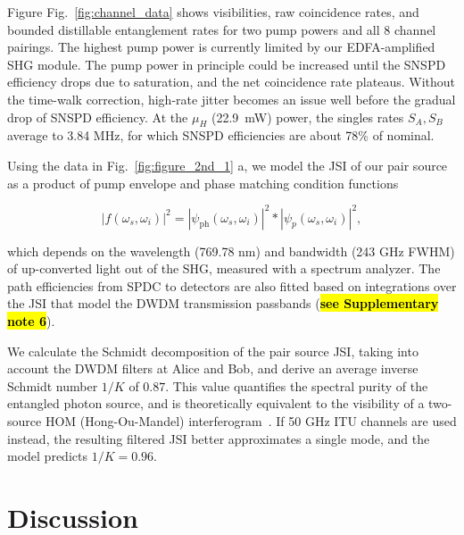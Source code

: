 \documentclass[11pt]{caltech_thesis} %
\begin{document}
Figure Fig.~\ref{fig:channel_data} shows visibilities, raw coincidence rates, and bounded distillable entanglement rates for two pump powers and all 8 channel pairings. The highest pump power is currently limited by our EDFA-amplified SHG module. The pump power in principle could be increased until the SNSPD efficiency drops due to saturation, and the net coincidence rate plateaus. Without the time-walk correction, high-rate jitter becomes an issue well before the gradual drop of SNSPD efficiency. At the $\mu_H$ (22.9~mW) power, the singles rates $S_A, S_B$ average to 3.84 MHz, for which SNSPD efficiencies are about 78\% of nominal.

Using the data in Fig.~\ref{fig:figure_2nd_1} a, we model the JSI of our pair source as a product of pump envelope and phase matching condition functions

$$
|f(\omega_s, \omega_i)|^2 = |\psi_{\mathrm{ph}}\left(\omega_s, \omega_i\right)|^2 *|\psi_p\left(\omega_s, \omega_i\right)|^2,
$$

which depends on the wavelength (769.78 nm) and bandwidth (243 GHz FWHM) of up-converted light out of the SHG, measured with a spectrum analyzer. The path efficiencies from SPDC to detectors are also fitted based on integrations over the JSI that model the DWDM transmission passbands (\textbf{\hl{see Supplementary note 6}}).

We calculate the Schmidt decomposition of the pair source JSI, taking into account the DWDM filters at Alice and Bob, and derive an average inverse Schmidt number $1/K$ of $0.87$. This value quantifies the spectral purity of the entangled photon source, and is theoretically equivalent to the visibility of a two-source HOM (Hong-Ou-Mandel) interferogram~\autocite{mandel1995optical}. If 50 GHz ITU channels are used instead, the resulting filtered JSI better approximates a single mode, and the model predicts $1/K = 0.96$.

\hypertarget{discussion-1}{%
\section{Discussion}\label{discussion-1}}
\end{document}
